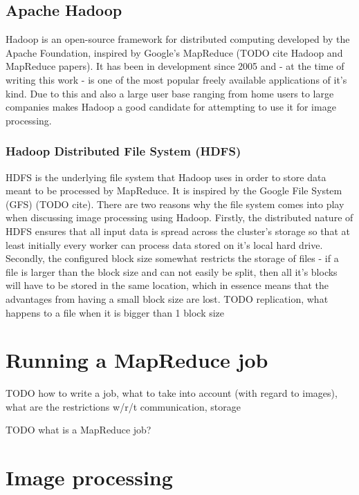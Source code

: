 \documentclass [12pt,a4paper]{report}
\begin{document}
 

\subsection{Apache Hadoop}
Hadoop is an open-source framework for distributed computing developed by the Apache Foundation, inspired by Google's MapReduce (TODO cite Hadoop and MapReduce papers). It has been in development since 2005 and - at the time of writing this work - is one of the most popular freely available applications of it's kind. Due to this and also a large user base ranging from home users to large companies makes Hadoop a good candidate for attempting to use it for image processing.

\subsubsection{Hadoop Distributed File System (HDFS)}
HDFS is the underlying file system that Hadoop uses in order to store data meant to be processed by MapReduce. It is inspired by the Google File System (GFS) (TODO cite). There are two reasons why the file system comes into play when discussing image processing using Hadoop. Firstly, the distributed nature of HDFS ensures that all input data is spread across the cluster's storage so that at least initially every worker can process data stored on it's local hard drive. Secondly, the configured block size somewhat restricts the storage of files - if a file is larger than the block size and can not easily be split, then all it's blocks will have to be stored in the same location, which in essence means that the advantages from having a small block size are lost.
TODO replication, what happens to a file when it is bigger than 1 block size

\section{Running a MapReduce job}

TODO how to write a job, what to take into account (with regard to images), what are the restrictions w/r/t communication, storage

TODO what is a MapReduce job?

\section{Image processing}
\end{document}
